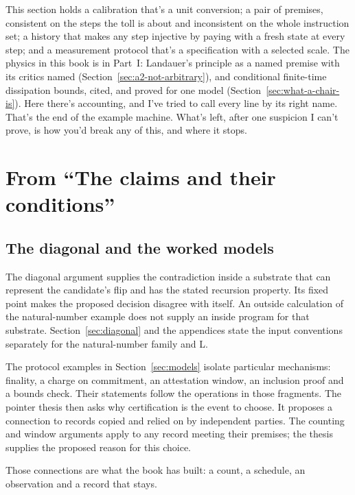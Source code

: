 \documentclass[11pt,twoside]{article}
\theoremstyle{thielethm}
\theoremstyle{thieledef}
\theoremstyle{thieledef}
\theoremstyle{thieledef}
\theoremstyle{thielethm}
\theoremstyle{thieleobs}
\theoremstyle{thielethm}
\begin{document}
This section holds a calibration that's a unit conversion; a pair of premises, consistent on
the steps the toll is about and inconsistent on the whole instruction set; a history that makes any step injective by paying with a fresh state at every step; and a
measurement protocol that's a specification with a selected scale. The physics in this book is
in Part~I: Landauer's principle as a named premise with its critics named (Section~\ref{sec:a2-not-arbitrary}), and conditional finite-time dissipation bounds, cited, and proved for one model (Section~\ref{sec:what-a-chair-is}). Here there's
accounting, and I've tried to call every line by its right name. That's the end of the example machine.
What's left, after one suspicion I can't prove, is how you'd break any of this, and where it stops.


\section{From ``The claims and their conditions''}
\subsection{The diagonal and the worked models}

The diagonal argument supplies the contradiction inside a substrate that can represent
the candidate's flip and has the stated recursion property. Its fixed point makes the
proposed decision disagree with itself. An outside calculation of the natural-number
example does not supply an inside program for that substrate. Section~\ref{sec:diagonal}
and the appendices state the input conventions separately for the natural-number family
and L.

The protocol examples in Section~\ref{sec:models} isolate particular mechanisms: finality,
a charge on commitment, an attestation window, an inclusion proof and a bounds check. Their
statements follow the operations in those fragments. The pointer thesis then asks why
certification is the event to choose. It proposes a connection to records copied and relied
on by independent parties. The counting and window arguments apply to any record meeting
their premises; the thesis supplies the proposed reason for this choice.

Those connections are what the book has built: a count, a schedule, an observation and a
record that stays.
\end{document}
